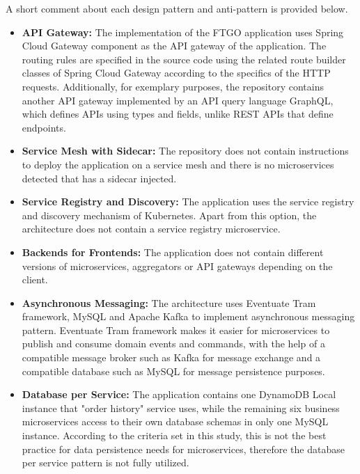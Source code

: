 \documentclass{Configuration_Files/PoliMi3i_thesis}
\begin{document}
A short comment about each design pattern and anti-pattern is provided below.

\begin{itemize}
    \item \textbf{API Gateway:} The implementation of the FTGO application uses Spring Cloud Gateway\footnotemark[90] component as the API gateway of the application.
    The routing rules are specified in the source code using the related route builder classes of Spring Cloud Gateway according to the specifics of the HTTP requests.
    Additionally, for exemplary purposes, the repository contains another API gateway implemented by an API query language GraphQL\footnotemark[91], which defines APIs using types and fields, unlike REST APIs that define endpoints.
    
    \item \textbf{Service Mesh with Sidecar:} The repository does not contain instructions to deploy the application on a service mesh and there is no microservices detected that has a sidecar injected.
    
    \item \textbf{Service Registry and Discovery:} The application uses the service registry and discovery mechanism of Kubernetes.
    Apart from this option, the architecture does not contain a service registry microservice.
    
    \item \textbf{Backends for Frontends:} The application does not contain different versions of microservices, aggregators or API gateways depending on the client.
    
    \item \textbf{Asynchronous Messaging:} The architecture uses Eventuate Tram framework, MySQL and Apache Kafka to implement asynchronous messaging pattern.
    Eventuate Tram framework makes it easier for microservices to publish and consume domain events and commands, with the help of a compatible message broker such as Kafka for message exchange and a compatible database such as MySQL for message persistence purposes.
    
    \item \textbf{Database per Service:} The application contains one DynamoDB Local instance that "order history" service uses, while the remaining six business microservices access to their own database schemas in only one MySQL instance.
    According to the criteria set in this study, this is not the best practice for data persistence needs for microservices, therefore the database per service pattern is not fully utilized.
    

\end{itemize}
\end{document}
